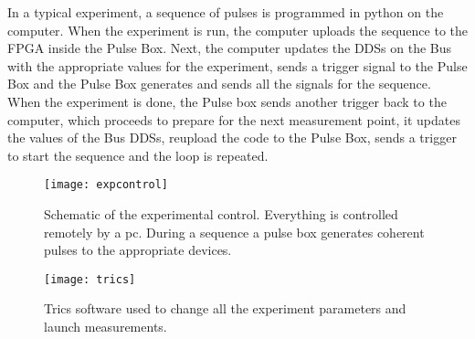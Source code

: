 In a typical experiment, a sequence of pulses is programmed in python on the computer. When the experiment is run, the computer uploads the sequence to the FPGA inside the Pulse Box. Next, the computer updates the DDSs on the Bus with the appropriate values for the experiment, sends a trigger signal to the Pulse Box and the Pulse Box generates and sends all the signals for the sequence. When the experiment is done, the Pulse box sends another trigger back to the computer, which proceeds to prepare for the next measurement point, it updates the values of the Bus DDSs, reupload the code to the Pulse Box, sends a trigger to start the sequence and the loop is repeated.

\begin{figure}
\centering
\texttt{[image: expcontrol]}
\caption{Schematic of the experimental control. Everything is controlled remotely by a pc. During a sequence a pulse box generates coherent pulses to the appropriate devices.}
\label{expcontrol}
\end{figure}

\begin{figure}
\centering
\texttt{[image: trics]}
\caption{Trics software used to change all the experiment parameters and launch measurements.}
\label{trics}
\end{figure}
